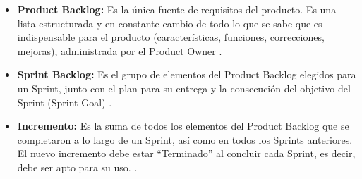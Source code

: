 \begin{itemize}
    \item \textbf{Product Backlog:} Es la única fuente de requisitos del producto. Es una lista estructurada y en constante cambio de todo lo que se sabe que es indispensable para el producto (características, funciones, correcciones, mejoras), administrada por el Product Owner \cite{dixit2019scrum}.
    \item \textbf{Sprint Backlog:} Es el grupo de elementos del Product Backlog elegidos para un Sprint, junto con el plan para su entrega y la consecución del objetivo del Sprint (Sprint Goal) \cite{schwaber2013guia}.
    \item \textbf{Incremento:} Es la suma de todos los elementos del Product Backlog que se completaron a lo largo de un Sprint, así como en todos los Sprints anteriores. El nuevo incremento debe estar ``Terminado'' al concluir cada Sprint, es decir, debe ser apto para su uso. \cite{schwaber2013guia}.
\end{itemize}


    

